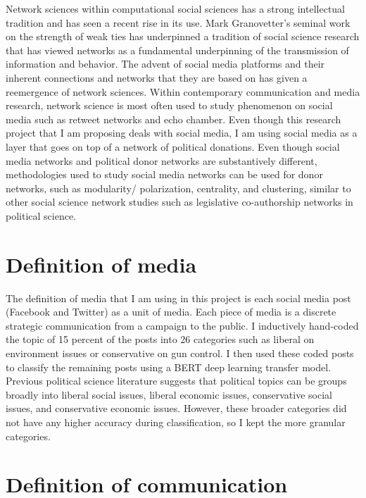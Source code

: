 \documentclass[12pt,]{article}
\begin{document}
Network sciences within computational social sciences has a strong
intellectual tradition and has seen a recent rise in its use. Mark
Granovetter's seminal work on the strength of weak ties has underpinned
a tradition of social science research that has viewed networks as a
fundamental underpinning of the transmission of information and
behavior. The advent of social media platforms and their inherent
connections and networks that they are based on has given a reemergence
of network sciences. Within contemporary communication and media
research, network science is most often used to study phenomenon on
social media such as retweet networks and echo chamber. Even though this
research project that I am proposing deals with social media, I am using
social media as a layer that goes on top of a network of political
donations. Even though social media networks and political donor
networks are substantively different, methodologies used to study social
media networks can be used for donor networks, such as modularity/
polarization, centrality, and clustering, similar to other social
science network studies such as legislative co-authorship networks in
political science.

\hypertarget{definition-of-media}{%
\section{Definition of media}\label{definition-of-media}}

The definition of media that I am using in this project is each social
media post (Facebook and Twitter) as a unit of media. Each piece of
media is a discrete strategic communication from a campaign to the
public. I inductively hand-coded the topic of 15 percent of the posts
into 26 categories such as liberal on environment issues or conservative
on gun control. I then used these coded posts to classify the remaining
posts using a BERT deep learning transfer model. Previous political
science literature suggests that political topics can be groups broadly
into liberal social issues, liberal economic issues, conservative social
issues, and conservative economic issues. However, these broader
categories did not have any higher accuracy during classification, so I
kept the more granular categories.

\hypertarget{definition-of-communication}{%
\section{Definition of
communication}\label{definition-of-communication}}
\end{document}
